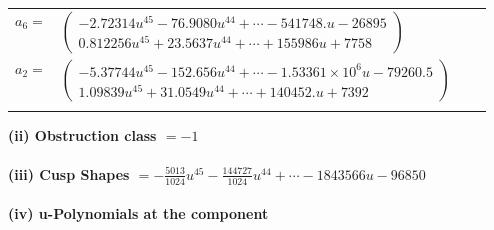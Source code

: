 \documentclass[1p]{elsarticle_modified}
\theoremstyle{definition}
\begin{document}
\begin{tabular}{m{7pt} m{180pt} m{7pt} m{180pt} }
\flushright $a_{6}=$&$\begin{pmatrix}-2.72314 u^{45}-76.9080 u^{44}+\cdots-541748. u-26895\\0.812256 u^{45}+23.5637 u^{44}+\cdots+155986 u+7758\end{pmatrix}$ \\
\flushright $a_{2}=$&$\begin{pmatrix}-5.37744 u^{45}-152.656 u^{44}+\cdots-1.53361\times10^{6} u-79260.5\\1.09839 u^{45}+31.0549 u^{44}+\cdots+140452. u+7392\end{pmatrix}$\\&\end{tabular}
\flushleft \textbf{(ii) Obstruction class $= -1$}\\~\\
\flushleft \textbf{(iii) Cusp Shapes $= -\frac{5013}{1024} u^{45}-\frac{144727}{1024} u^{44}+\cdots-1843566 u-96850$}\\~\\
\newpage\renewcommand{\arraystretch}{1}
\flushleft \textbf{(iv) u-Polynomials at the component}\newline \\
\end{document}
